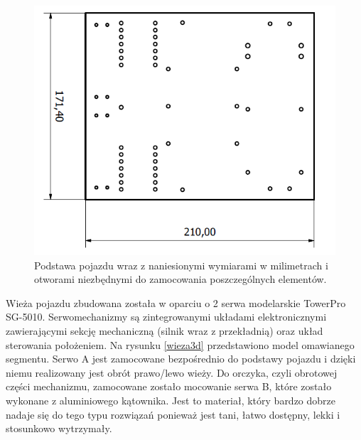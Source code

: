   \begin{figure}[H]
    \begin{center}
      \includegraphics[scale=0.5]{imgs/podstawa.png}
 	\caption[Podstawa pojazdu.]{\small{Podstawa pojazdu wraz z naniesionymi wymiarami w milimetrach i otworami niezbędnymi do zamocowania poszczególnych elementów.}}
	\label{podst3d}
    \end{center}
  \end{figure}
Wieża pojazdu zbudowana została w oparciu o 2 serwa modelarskie TowerPro SG-5010. Serwomechanizmy są zintegrowanymi układami elektronicznymi zawierającymi sekcję mechaniczną (silnik wraz z przekładnią) oraz układ sterowania położeniem.
Na rysunku \ref{wieza3d} przedstawiono model omawianego segmentu. Serwo A jest zamocowane bezpośrednio do podstawy pojazdu i dzięki niemu realizowany jest obrót prawo/lewo wieży. Do orczyka, czyli obrotowej części mechanizmu, zamocowane zostało mocowanie serwa B, które zostało wykonane z aluminiowego kątownika. Jest to materiał, który bardzo dobrze nadaje się do tego typu rozwiązań ponieważ jest tani, łatwo dostępny, lekki i stosunkowo wytrzymały.  

